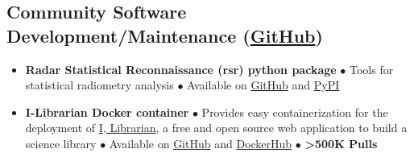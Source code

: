 \vspace{-1em}
\subsection*{Community Software Development/Maintenance (\href{https://github.com/cgrima}{GitHub})}
\vspace{-.5em}

\begin{itemize}[leftmargin=*]
    \item
    \textbf{Radar Statistical Reconnaissance (rsr) python package} $\bullet$ Tools for statistical radiometry analysis $\bullet$ Available on \href{https://github.com/cgrima/rsr}{GitHub} and \href{https://pypi.org/project/rsr/}{PyPI}
    \vspace{-.5em}
    \item
    \textbf{I-Librarian Docker container} $\bullet$ Provides easy containerization for the deployment of \href{https://i-librarian.net/}{I, Librarian}, a free and open source web application to build a science library $\bullet$ Available on \href{https://github.com/cgrima/docker_i-librarian}{GitHub} and \href{https://hub.docker.com/r/cgrima/i-librarian}{DockerHub} $\bullet$ \textbf{>500K Pulls} 
\end{itemize}

